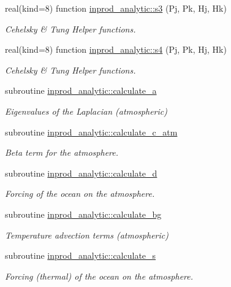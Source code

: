 \begin{DoxyCompactItemize}
real(kind=8) function \hyperlink{namespaceinprod__analytic_a671ca8c3aae1db0a453a13e94462baa0}{inprod\+\_\+analytic\+::s3} (Pj, Pk, Hj, Hk)
\begin{DoxyCompactList}\small\item\em Cehelsky \& Tung Helper functions. \end{DoxyCompactList}\item 
real(kind=8) function \hyperlink{namespaceinprod__analytic_a8dacf930ffdf8fd09da0a77bfd4d3a4b}{inprod\+\_\+analytic\+::s4} (Pj, Pk, Hj, Hk)
\begin{DoxyCompactList}\small\item\em Cehelsky \& Tung Helper functions. \end{DoxyCompactList}\item 
subroutine \hyperlink{namespaceinprod__analytic_a9a003ced8e18bf5299c05dc76a8b1e47}{inprod\+\_\+analytic\+::calculate\+\_\+a}
\begin{DoxyCompactList}\small\item\em Eigenvalues of the Laplacian (atmospheric) \end{DoxyCompactList}\item 
subroutine \hyperlink{namespaceinprod__analytic_afa4abc3665e4628bda2deb421c123e05}{inprod\+\_\+analytic\+::calculate\+\_\+c\+\_\+atm}
\begin{DoxyCompactList}\small\item\em Beta term for the atmosphere. \end{DoxyCompactList}\item 
subroutine \hyperlink{namespaceinprod__analytic_a1b0c41711a02f385766aeef2faf22830}{inprod\+\_\+analytic\+::calculate\+\_\+d}
\begin{DoxyCompactList}\small\item\em Forcing of the ocean on the atmosphere. \end{DoxyCompactList}\item 
subroutine \hyperlink{namespaceinprod__analytic_a9d5aac589aca6ec73373fa05a8195c20}{inprod\+\_\+analytic\+::calculate\+\_\+bg}
\begin{DoxyCompactList}\small\item\em Temperature advection terms (atmospheric) \end{DoxyCompactList}\item 
subroutine \hyperlink{namespaceinprod__analytic_af2f7504623cdd4e4e6b4b977126475ea}{inprod\+\_\+analytic\+::calculate\+\_\+s}
\begin{DoxyCompactList}\small\item\em Forcing (thermal) of the ocean on the atmosphere. \end{DoxyCompactList}\item 

\end{DoxyCompactItemize}
